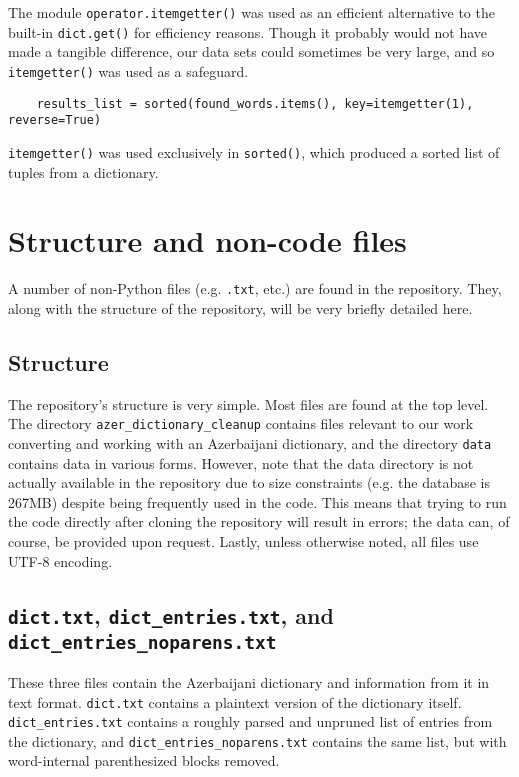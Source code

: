 \documentclass{article}      %
\begin{document}
	The module \texttt{operator.itemgetter()} was used as an efficient alternative to the built-in \texttt{dict.get()} for efficiency reasons. Though it probably would not have made a tangible difference, our data sets could sometimes be very large, and so \texttt{itemgetter()} was used as a safeguard.
	
	\begin{verbatim}
	results_list = sorted(found_words.items(), key=itemgetter(1), reverse=True)
	\end{verbatim}
	
	\texttt{itemgetter()} was used exclusively in \texttt{sorted()}, which produced a sorted list of tuples from a dictionary.
		
		
	\section{Structure and non-code files}
	
	A number of non-Python files (e.g. \texttt{.txt}, etc.) are found in the repository. They, along with the structure of the repository, will be very briefly detailed here.
	
	\subsection{Structure}
	
	The repository's structure is very simple. Most files are found at the top level. The directory \texttt{azer\_dictionary\_cleanup} contains files relevant to our work converting and working with an Azerbaijani dictionary, and the directory \texttt{data} contains data in various forms. However, note that the data directory is not actually available in the repository due to size constraints (e.g. the database is 267MB) despite being frequently used in the code. This means that trying to run the code directly after cloning the repository will result in errors; the data can, of course, be provided upon request. Lastly, unless otherwise noted, all files use UTF-8 encoding.
	
	\subsection{\texttt{dict.txt}, \texttt{dict\_entries.txt}, and \texttt{dict\_entries\_noparens.txt}}
	
	These three files contain the Azerbaijani dictionary and information from it in text format. \texttt{dict.txt} contains a plaintext version of the dictionary itself. \texttt{dict\_entries.txt} contains a roughly parsed and unpruned list of entries from the dictionary, and \texttt{dict\_entries\_noparens.txt} contains the same list, but with word-internal parenthesized blocks removed.
	
\end{document}
